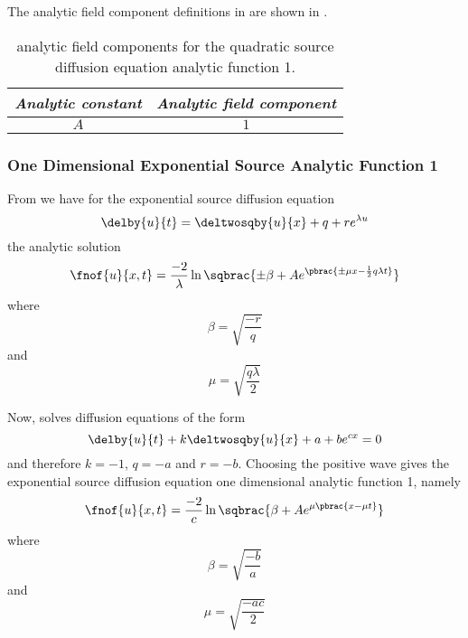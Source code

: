 The analytic field component definitions in \OpenCMISS are shown in .

\begin{table}[htb] \centering
  \begin{tabular}{|c|c|} \hline
    \emph{Analytic constant} & \emph{Analytic field component} \\ \hline \hline
    $A$ & $1$ \\ \hline
  \end{tabular}
  \caption{\OpenCMISS analytic field components for the \oned quadratic
    source diffusion equation analytic function 1.}
  \label{tab:OpenCMISSAnalyticFieldQuadraticSoureDiffusionEquationOneDim1}
\end{table}

\subsubsection{One Dimensional Exponential Source Analytic Function 1}

From  we have for
the \oned exponential source diffusion equation
\begin{equation}
  \delby{u}{t}=\deltwosqby{u}{x}+q+re^{\lambda u}
\end{equation}
the analytic solution
\begin{equation}
  \fnof{u}{x,t}=\dfrac{-2}{\lambda}\ln\sqbrac{\pm\beta+Ae^{\pbrac{\pm\mu x - \frac{1}{2}q \lambda t}}}
\end{equation}
where
\begin{equation}
  \beta=\sqrt{\dfrac{-r}{q}}
\end{equation}
and 
\begin{equation}
  \mu=\sqrt{\dfrac{q\lambda}{2}}
\end{equation}

Now, \OpenCMISS solves diffusion equations of the form
\begin{equation}
  \delby{u}{t}+k\deltwosqby{u}{x}+a+be^{cx}=0
  \label{eqn:OpenCMISSExponentialSourceDiffusionEquationOneDim}
\end{equation}
and therefore $k=-1$, $q=-a$ and $r=-b$. Choosing the positive wave gives the
\OpenCMISS exponential source diffusion equation one dimensional analytic function 1, namely
\begin{equation}
  \fnof{u}{x,t}=\dfrac{-2}{c}\ln\sqbrac{\beta+Ae^{\mu\pbrac{x - \mu t}}}
  \label{eqn:AnalyticExponentialSourceDiffusionEquationOneDim1}
\end{equation}
where
\begin{equation}
  \beta=\sqrt{\dfrac{-b}{a}}
\end{equation}
and 
\begin{equation}
  \mu=\sqrt{\dfrac{-ac}{2}}
\end{equation}

